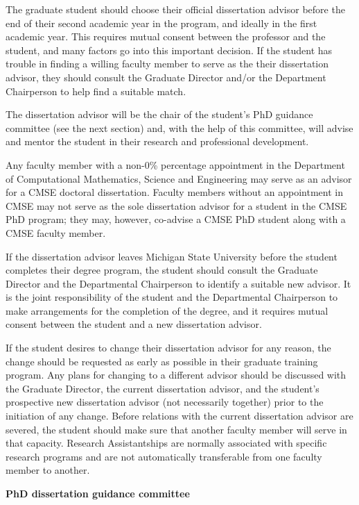 The graduate student should choose their official dissertation advisor
before the end of their second academic year in the program, and
ideally in the first academic year.  This requires mutual consent
between the professor and the student, and many factors go into this
important decision.  If the student has trouble in finding a willing
faculty member to serve as the their dissertation advisor, they should
consult the Graduate Director and/or the Department Chairperson to
help find a suitable match.

The dissertation advisor will be the chair of the student's PhD
guidance committee (see the next section) and, with the help of this
committee, will advise and mentor the student in their research and
professional development.  

Any faculty member with a non-0\% percentage appointment in the
Department of Computational Mathematics, Science and Engineering may
serve as an advisor for a CMSE doctoral dissertation.  Faculty members
without an appointment in CMSE may not serve as the sole dissertation
advisor for a student in the CMSE PhD program; they may, however,
co-advise a CMSE PhD student along with a CMSE faculty member.

If the dissertation advisor leaves Michigan State University before the
student completes their degree program, the student should consult
the Graduate Director and the Departmental Chairperson to identify a
suitable new advisor.  It is the joint responsibility of the
student and the Departmental Chairperson to make arrangements for the
completion of the degree, and it requires mutual consent between the
student and a new dissertation advisor.

If the student desires to change their dissertation advisor for any
reason, the change should be requested as early as possible in their
graduate training program.  Any plans for changing to a different
advisor should be discussed with the Graduate Director, 
 the current dissertation advisor, and the student's
prospective new dissertation advisor (not necessarily together) prior
to the initiation of any change.  Before relations with the current
dissertation advisor are severed, the student should make sure that
another faculty member will serve in that capacity.  Research
Assistantships are normally associated with specific research programs
and are not automatically transferable from one faculty member to
another.

\vspace{3mm}
\noindent
\textbf{PhD dissertation guidance committee}


